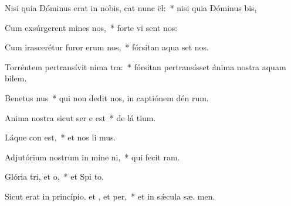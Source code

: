 \item Nisi quia Dóminus erat in nobis, cat nunc ël:~* nisi quia Dóminus   bis,
\item Cum exsúrgerent mines  nos,~* forte vi sent nos:
\item Cum irascerétur furor erum  nos,~* fórsitan aqua set nos.
\item Torréntem pertransívit nima tra:~* fórsitan pertransísset ánima nostra aquam bilem.
\item Benetus nus~* qui non dedit nos, in captiónem dén rum.
\item Anima nostra sicut ser e est~* de lá tium.
\item Láque con est,~* et nos li mus.
\item Adjutórium nostrum in mine ni,~* qui fecit   ram.
\item Glória tri, et o,~* et Spi to.
\item Sicut erat in princípio, et , et per,~* et in sǽcula sæ. men.
